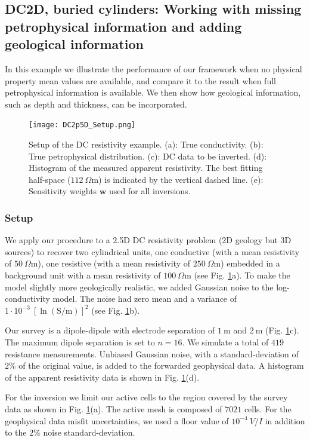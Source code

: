 \documentclass[extra]{gji} %
\begin{document}
\subsection{DC2D, buried cylinders: Working with missing petrophysical information and adding geological information} \label{DCexample}

In this example we illustrate the performance of our framework when no physical property mean values are available, and compare it to the result when full petrophysical information is available. We then show how geological information, such as depth and thickness, can be incorporated.

\begin{figure}
\centering
\texttt{[image: DC2p5D\_Setup.png]}
\caption[]{Setup of the DC resistivity example. (a): True conductivity. (b): True petrophysical distribution. (c): DC data to be inverted. (d): Histogram of the measured apparent resistivity. The best fitting half-space ($112~\Omega \text{m}$) is indicated by the vertical dashed line. (e): Sensitivity weights $\mathbf{w}$ used for all inversions.}
\label{fig:DC2p5D_Setup}
\end{figure}


\subsubsection{Setup}

We apply our procedure to a 2.5D DC resistivity problem (2D geology but 3D sources) to recover two cylindrical units, one conductive (with a mean resistivity of $50~\Omega \text{m}$), one resistive (with a mean resistivity of $250~\Omega \text{m}$) embedded in a background unit with a mean resistivity of $100~\Omega \text{m}$ (see Fig. \ref{fig:DC2p5D_Setup}a). To make the model slightly more geologically realistic, we added Gaussian noise to the log-conductivity model. The noise had zero mean and a variance of $1\cdot10^{-3}~[\ln(\text{S/m})]^2$ (see Fig. \ref{fig:DC2p5D_Setup}b).

Our survey is a dipole-dipole with electrode separation of $1~\text{m}$ and $2~\text{m}$ (Fig. \ref{fig:DC2p5D_Setup}c). The maximum dipole separation is set to $n=16$. We simulate a total of $419$ resistance measurements. Unbiased Gaussian noise, with a standard-deviation of $2\%$ of the original value, is added to the forwarded geophysical data. A histogram of the apparent resistivity data is shown in Fig. \ref{fig:DC2p5D_Setup}(d).

For the inversion we limit our active cells to the region covered by the survey data as shown in Fig. \ref{fig:DC2p5D_Setup}(a). The active mesh is composed of $7021$ cells. For the geophysical data misfit uncertainties, we used a floor value of $10^{-4}~V/I$ in addition to the $2\%$ noise standard-deviation.
\end{document}
